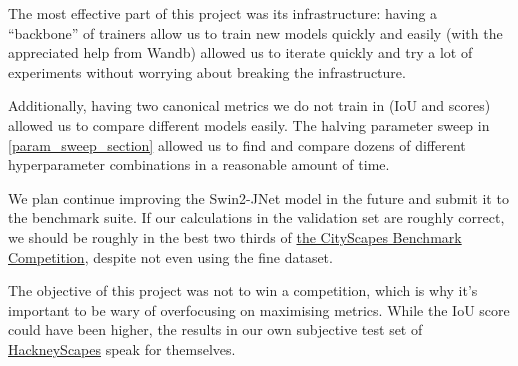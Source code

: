 The most effective part of this project was its infrastructure: having a ``backbone'' of trainers allow us to train new models quickly and easily (with the appreciated help from Wandb) allowed us to iterate quickly and try a lot of experiments without worrying about breaking the infrastructure.

Additionally, having two canonical metrics we do not train in (IoU and \iiouc{} scores) allowed us to compare different models easily.
The halving parameter sweep in \cref{param_sweep_section} allowed us to find and compare dozens of different hyperparameter combinations in a reasonable amount of time.

We plan continue improving the Swin2-JNet model in the future and submit it to the benchmark suite.
If our calculations in the validation set are roughly correct, we should be roughly in the best two thirds of \href{https://www.cityscapes-dataset.com/benchmarks/#pixel-level-results}{the CityScapes Benchmark Competition}, despite not even using the fine dataset.

The objective of this project was not to win a competition, which is why it's important to be wary of overfocusing on maximising metrics.
While the IoU score could have been higher, the results in our own subjective test set of \hyperref[hackneyscapes]{HackneyScapes} speak for themselves.
